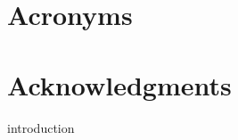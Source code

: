 \documentclass[openright,titlepage,numbers=noenddot,headinclude,footinclude=true,cleardoublepage=empty,abstractoff,BCOR=5mm,paper=a4,fontsize=11pt,]{scrreprt}
\begin{document}



\newpage
\tableofcontents
\chapter*{Acronyms}

\listoffigures
\listoftables

\cleardoublepage
{}


\newtheorem{mydef}{Definition}


\chapter*{Acknowledgments}

{introduction}








\nocite{*}



\begingroup
\RaggedRight
\printbibliography
\endgroup

\end{document}
